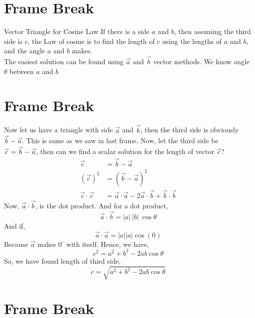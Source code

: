 \documentclass[9pt]{memoir}
\newcommand{\draw}[3]{ \begin{figure}[H] \centering
 \fontsize{35pt}{20pt}\selectfont \resizebox{#1 \textwidth}{!}{
{#2.pdf_tex}}\caption{#3} \label{#3} \end{figure} }
\begin{document}
\section{Frame Break}
%
%
%
%
%
%


    {Vector Triangle for Cosine Law}
    {If there is a side $a$ and $b$, then assuming the third side is $c$, the Law of cosine is to find the length of $c$ using the lengths of $a$ and $b$, and the angle $a$ and $b$ makes. \\
    The easiest solution can be found using $\vec a$ and $\vec b$ vector methods. We know angle $\theta$ between $a$ and $b$ }{
    }
\section{Frame Break}



    Now let us have a triangle with side $\vec a$ and $\vec b$, then the third side is obviously $\vec b - \vec a$. This is same as we saw in last frame. Now, let the third side be $\vec c = \vec b - \vec a$, then can we find a scalar solution for the length of vector $\vec c$?\\
    \begin{align*}
        \vec c &= \vec b - \vec a \\     
        \left(  \vec c \right) ^2 &=  \left( \vec b - \vec a \right) ^2 \\  
        \vec c \cdot \vec c &= \vec a \cdot \vec a -
        2 \vec a \cdot \vec b +
        \vec b \cdot \vec b 
    \end{align*}
    Now, $\vec a \cdot \vec b$, is the dot product. And for a dot product, 
    \[ \vec a \cdot \vec b = |a| \ |b| \ \cos \theta  \]  
    And if, 
    \[ \vec a \cdot \vec a = |a| |a | \cos \left( 0 \right)  \]  
    Because $\vec a$ makes $0 ^{\circ}$ with itself. Hence, we have, 
    \[ c^2 = a^2 + b^2 - 2ab \cos\theta \]
    So, we have found length of third side,  \[ c=
    \sqrt{a^2 + b^2 - 2ab \cos \theta}  \]
     
\section{Frame Break}
\end{document}
